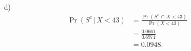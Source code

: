 \documentclass[12pt]{article}
\begin{document}
{\begin{minipage}[t]{0.98\textwidth}
\begin{minipage}[t]{0.47\textwidth}
\begin{enumerate}
\begin{align*}
&=0.75(0.8413)+0.25(0.2643)\\
&=  0.6310 + 0.0661\\
&= 0.6971.
\end{align*}
\item[d)]\quad\\[-1.45cm]
\begin{align*}
\Pr(S^c\,|\,X<43) &= \frac{\Pr(S^c\,\cap\,X<43)}{\Pr(X<43)}\\[0.2cm]
 &= \frac{0.0661}{0.6971}\\[0.2cm]
 &=0.0948.
\end{align*}
\end{enumerate}
\end{minipage}
\end{minipage}}\vspace{0.03\textwidth}
\end{document}
